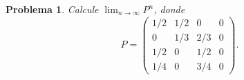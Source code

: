 \documentclass[12pt]{article}
\newtheorem{problem}{Problema}
\begin{document}
\begin{problem}
Calcule $\displaystyle\lim_{n\to\infty} P^n$, donde
\[
P = \begin{pmatrix}
1/2 & 1/2 & 0   & 0 \\[4pt]
0   & 1/3 & 2/3 & 0 \\[4pt]
1/2 & 0   & 1/2 & 0 \\[4pt]
1/4 & 0   & 3/4 & 0
\end{pmatrix}.
\]
\end{problem}
\end{document}
